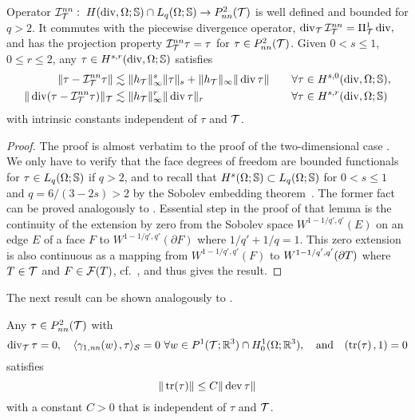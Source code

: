 \documentclass[11pt]{article}
\begin{document}
\begin{prop}[interpolation] \label{prop_Inn}
Operator $\mathcal{I}^{nn}_{\mathcal{T}}:\;H(\operatorname{div},\Omega;\mathbb{S})\cap L_q(\Omega;\mathbb{S})\to P^2_{nn}(\mathcal{T})$ is
well defined and bounded for $q>2$.
It commutes with the piecewise divergence operator,
\(
   \operatorname{div}_{\mathcal{T}}\mathcal{I}^{nn}_{\mathcal{T}}=\Pi^1_{\mathcal{T}}\operatorname{div},
\)
and has the projection property
$\mathcal{I}^{nn}_{\mathcal{T}}\tau=\tau$ for $\tau\in P^2_{nn}(\mathcal{T})$.
Given $0<s\le 1$, $0\le r\le 2$, any $\tau\in H^{s,r}(\operatorname{div},\Omega;\mathbb{S})$ satisfies
\begin{alignat*}{2}
   \|\tau-\mathcal{I}^{nn}_{\mathcal{T}}\tau\|
   &\lesssim \|h_{\mathcal{T}}\|_{\infty}^s \|\tau\|_s +  \|h_{\mathcal{T}}\|_{\infty} \|\operatorname{div}\tau\|\quad
   &&\forall \tau\in H^{s,0}(\operatorname{div},\Omega;\mathbb{S}),\\
   \|\operatorname{div}(\tau-\mathcal{I}^{nn}_{\mathcal{T}}\tau)\|_{\mathcal{T}}
   &\lesssim \|h_{\mathcal{T}}\|_\infty^r \|\operatorname{div}\tau\|_r
   \quad&&\forall \tau\in H^{s,r}(\operatorname{div},\Omega;\mathbb{S})
\end{alignat*}
with intrinsic constants independent of $\tau$ and $\mathcal{T}$.
\end{prop}

\begin{proof}
The proof is almost verbatim to the proof of the two-dimensional case
\cite[Proposition~17]{CarstensenH_NNC}.
We only have to verify that the face degrees of freedom are bounded functionals
for $\tau\in L_q(\Omega;\mathbb{S})$ if $q>2$, and
to recall that $H^s(\Omega;\mathbb{S})\subset L_q(\Omega;\mathbb{S})$ for $0<s\le 1$ and $q=6/(3-2s)>2$
by the Sobolev embedding theorem~\cite[Theorem~7.57]{Adams}.
The former fact can be proved analogously to \cite[Lemma~4.7]{AmroucheBDG_98_VPT}.
Essential step in the proof of that lemma is the continuity
of the extension by zero from the Sobolev space $W^{1-1/q',q'}(E)$ on an edge $E$ of
a face $F$ to $W^{1-1/q',q'}(\partial F)$ where $1/q'+1/q=1$.
This zero extension is also continuous as a mapping from $W^{1-1/q',q'}(F)$
to $W^{1-1/q',q'}(\partial T)$ where $T\in\mathcal{T}$ and $F\in\mathcal{F}(T)$,
cf.~\cite[Corollary~1.4.4.5]{Grisvard_85_EPN}, and thus gives the result.
\end{proof}

The next result can be shown analogously to \cite[Lemma~20]{CarstensenH_NNC}.

\begin{lemma} \label{la_trdevdiv2}
Any $\tau\in P^2_{nn}(\mathcal{T})$ with
\[
   \operatorname{div}_{\mathcal{T}}\tau=0,\quad
   \langle{}{\gamma_{1,\mathit{nn}}}(w)\hspace*{.5mm},\tau\rangle_{\mathcal{S}}=0\ \forall w\in P^1(\mathcal{T};\mathbb{R}^3)\cap H^1_0(\Omega;\mathbb{R}^3),
   \quad\text{and}\quad
   (\operatorname{tr}(\tau)\hspace*{.5mm},1)=0
\]
satisfies
\[
   \|\operatorname{tr}(\tau)\| \le C \|\operatorname{dev}\tau\|
\]
with a constant $C>0$ that is independent of $\tau$ and $\mathcal{T}$.
\end{lemma}
\end{document}
